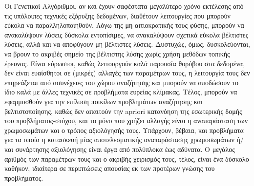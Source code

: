 Οι Γενετικοί Αλγόριθμοι, αν και έχουν σαφέστατα μεγαλύτερο χρόνο εκτέλεσης από τις υπόλοιπες τεχνικές εξόρυξης δεδομένων, διαθέτουν λειτουργίες που μπορούν εύκολα να παραλληλοποιηθούν. Λόγω της μη αιτιοκρατικής τους φύσης, μπορούν να ανακαλύψουν λύσεις δύσκολα εντοπίσιμες, να ανακαλύψουν σχετικά εύκολα βέλτιστες λύσεις, αλλά και να αποφύγουν μη βέλτιστες λύσεις. Δυστυχώς, όμως, δυσκολεύονται, να βρουν το ακριβές σημείο της βέλτιστης λύσης χωρίς χρήση μεθόδων τοπικής έρευνας. Είναι εύρωστοι, καθώς λειτουργούν καλά παρουσία θορύβου στα δεδομένα, δεν είναι ευαίσθητοι σε (μικρές) αλλαγές των παραμέτρων τους, η λειτουργία τους δεν επηρεάζεται από ασυνέχειες του χώρου αναζήτησης και μπορούν να αποδώσουν το ίδιο καλά με άλλες τεχνικές σε προβλήματα ευρείας κλίμακας. Τέλος, μπορούν να εφαρμοσθούν για την επίλυση ποικίλων προβλημάτων αναζήτησης και βελτιστοποίησης, καθώς δεν απαιτούν την apriori κατανόηση της εσωτερικής δομής του προβλήματος-στόχου, και το μόνο που χρήζει αλλαγής είναι η αναπαράσταση των χρωμοσωμάτων και ο τρόπος αξιολόγησής τους. Υπάρχουν, βέβαια, και προβλήματα για τα οποία η κατασκευή μίας αποτελεσματικής αναπαράστασης χρωμοσωμάτων ή/και συνάρτησης αξιολόγησης είναι έργα από πολύπλοκα έως αδύνατα. Ο μεγάλος αριθμός των παραμέτρων τους και ο ακριβής χειρισμός τους, τέλος, είναι ένα δύσκολο καθήκον, ιδιαίτερα σε περιπτώσεις απουσίας εκ των προτέρων γνώσης του προβλήματος. 



